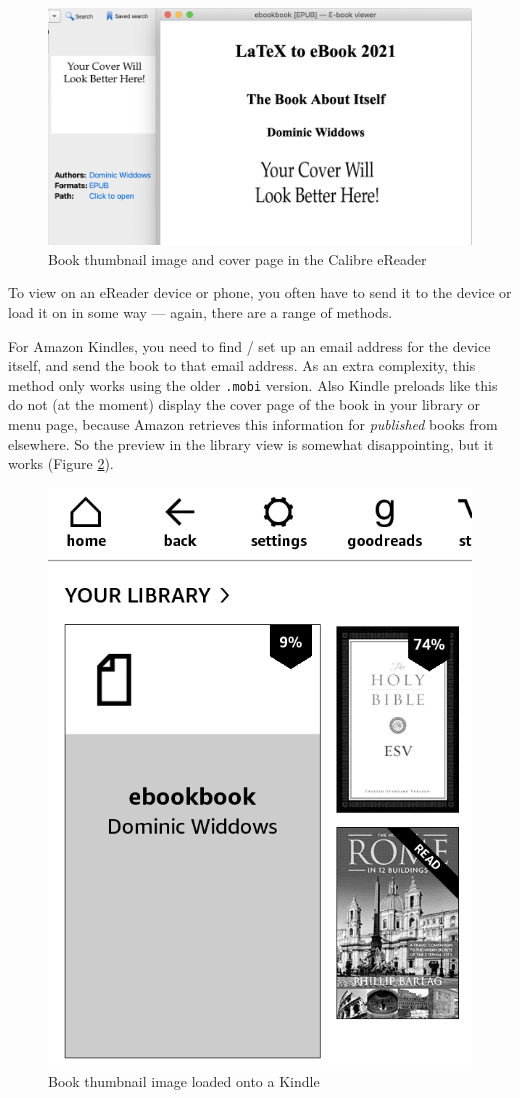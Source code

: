\begin{figure}
\begin{center}
\caption{Book thumbnail image and cover page in the Calibre eReader}
\label{fig:calibre_screenshot}
\includegraphics[width=\linewidth]{images/calibre_screenshot.png}
\end{center}
\end{figure}

To view on an eReader device or phone, you often have to send it to
the device or load it on in some way --- again, there are a range of
methods.

For Amazon Kindles, you need to find / set up an email address for the
device itself, and send the book to that email address. As an extra
complexity, this method only works using the older \texttt{.mobi}
version.  Also Kindle preloads like this do not (at the moment)
display the cover page of the book in your library or menu page,
because Amazon retrieves this information for {\em published} books
from elsewhere. So the preview in the library view is somewhat
disappointing, but it works (Figure \ref{fig:kindle_screenshot}).

\begin{figure}
\begin{center}
  \caption{Book thumbnail image loaded onto a Kindle}
  \label{fig:kindle_screenshot}
  \includegraphics[width=0.6\linewidth]{images/kindle_screenshot.png}
 \end{center}
\end{figure}

